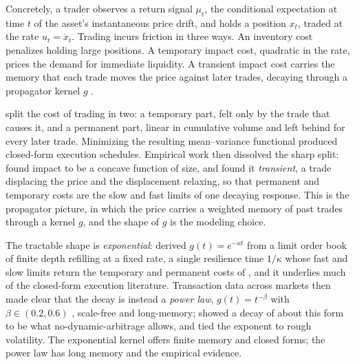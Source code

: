 \documentclass[11pt]{article}
\theoremstyle{plain}
\theoremstyle{definition}
\theoremstyle{remark}
\begin{document}
Concretely, a trader observes a return signal $\mu_t$, the conditional expectation at time $t$ of the asset's instantaneous price drift, and holds a position $x_t$, traded at the rate $u_t=\dot x_t$. Trading incurs friction in three ways. An inventory cost penalizes holding large positions. A temporary impact cost, quadratic in the rate, prices the demand for immediate liquidity. A transient impact cost carries the memory that each trade moves the price against later trades, decaying through a propagator kernel $g$ \citep{BouchaudGefenPottersWyart2004,Gatheral2010}.

\citet{AlmgrenChriss2001} split the cost of trading in two: a temporary part, felt only by the trade that causes it, and a permanent part, linear in cumulative volume and left behind for every later trade. Minimizing the resulting mean--variance functional produced closed-form execution schedules. Empirical work then dissolved the sharp split: \citet{LilloFarmerMantegna2003} found impact to be a concave function of size, and \citet{BouchaudGefenPottersWyart2004} found it \emph{transient}, a trade displacing the price and the displacement relaxing, so that permanent and temporary costs are the slow and fast limits of one decaying response. This is the propagator picture, in which the price carries a weighted memory of past trades through a kernel $g$, and the shape of $g$ is the modeling choice.

The tractable shape is \emph{exponential}: \citet{ObizhaevaWang2013} derived $g(t)=e^{-\kappa t}$ from a limit order book of finite depth refilling at a fixed rate, a single resilience time $1/\kappa$ whose fast and slow limits return the temporary and permanent costs of \citet{AlmgrenChriss2001}, and it underlies much of the closed-form execution literature. Transaction data across markets then made clear that the decay is instead a \emph{power law}, $g(t)=t^{-\beta}$ with $\beta\in(0.2,0.6)$ \citep{BouchaudGefenPottersWyart2004,JusselinRosenbaum2020}, scale-free and long-memory; \citet{Gatheral2010} showed a decay of about this form to be what no-dynamic-arbitrage allows, and \citet{JusselinRosenbaum2020} tied the exponent to rough volatility. The exponential kernel offers finite memory and closed forms; the power law has long memory and the empirical evidence.
\end{document}
